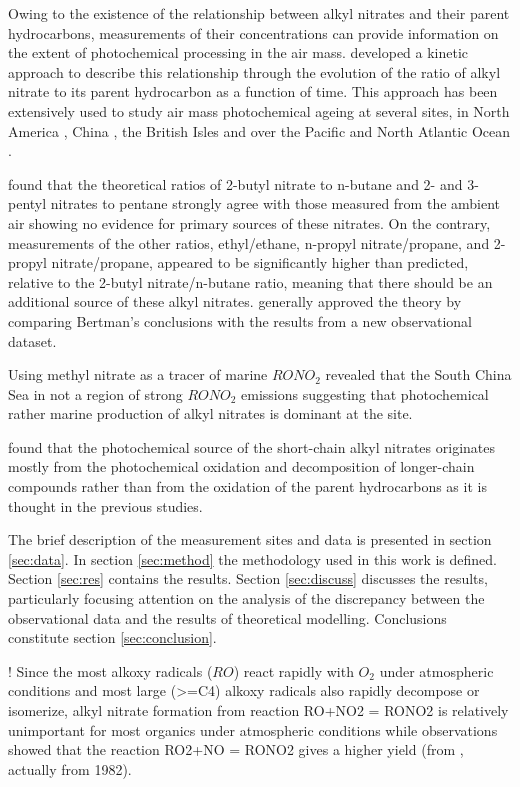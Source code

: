 \documentclass[11pt,a4paper]{article}
\begin{document}
Owing to the existence of the relationship between alkyl nitrates and their parent hydrocarbons, measurements of their concentrations can provide information on the extent of photochemical processing in the air mass. \cite{Bertman1995} developed a kinetic approach to describe this relationship through the evolution of the ratio of alkyl nitrate to its parent hydrocarbon as a function of time. This approach has been extensively used to study air mass photochemical ageing at several sites, in North America \citep{Bertman1995, Roberts1998}, China \citep{Simpson2006}, the British Isles \citep{Worton2010} and over the Pacific \citep{Simpson2003} and North Atlantic Ocean \citep{Reeves2007}.

\cite{Bertman1995} found that the theoretical ratios of  2-butyl nitrate to n-butane and 2- and 3-pentyl nitrates to pentane strongly agree with those measured from the ambient air showing no evidence for primary sources of these nitrates. On the contrary, measurements of the other ratios, ethyl/ethane, n-propyl nitrate/propane, and 2-propyl nitrate/propane, appeared to be significantly higher than predicted, relative to the 2-butyl nitrate/n-butane ratio, meaning that there should be an additional source of these alkyl nitrates. \cite{Roberts1998} generally approved the theory by comparing Bertman's conclusions with the results from a new observational dataset.

Using methyl nitrate as a tracer of marine $RONO_2$ \cite{Simpson2006} revealed that the South China Sea in not a region of strong $RONO_2$ emissions suggesting that photochemical rather marine production of alkyl nitrates is dominant at the site.

\cite{Worton2010} found that the photochemical source of the short-chain alkyl nitrates originates mostly from the photochemical oxidation and decomposition of longer-chain compounds rather than from the oxidation of the parent hydrocarbons as it is thought in the previous studies.

The brief description of the measurement sites and data is presented in section \ref{sec:data}. In section \ref{sec:method} the methodology used in this work is defined. Section \ref{sec:res} contains the results. Section \ref{sec:discuss} discusses the results, particularly focusing attention on the analysis of the discrepancy between the observational data and the results of theoretical modelling. Conclusions constitute section \ref{sec:conclusion}.

! Since the most alkoxy radicals ($RO$) react rapidly with $O_2$ under atmospheric conditions and most large (>=C4) alkoxy radicals also rapidly decompose or isomerize, alkyl nitrate formation from reaction RO+NO2 = RONO2 is relatively unimportant for most organics under atmospheric conditions while observations showed that the reaction RO2+NO = RONO2 gives a higher yield (from \citep{Atkinson2000}, actually from 1982).
\end{document}
